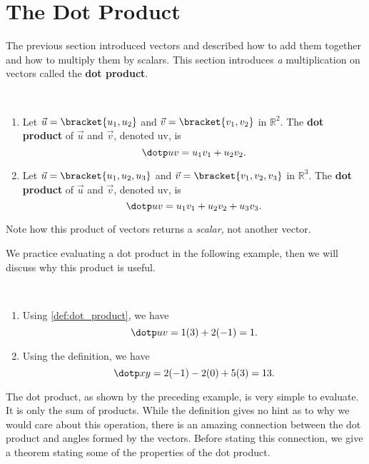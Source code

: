 \section{The Dot Product}\label{sec:dot_product}

The previous section introduced vectors and described how to add them together and how to multiply them by scalars. This section introduces \emph{a} multiplication on vectors called the \textbf{dot product}.

{
\mbox{}\\[-2\baselineskip]\begin{enumerate}
	\item Let $\vec u =\bracket{u_1,u_2}$ and $\vec v = \bracket{v_1,v_2}$  in $\mathbb{R}^2$. The \textbf{dot product} of $\vec u$ and $\vec v$, denoted \dotp uv, is 
	\[\dotp uv = u_1v_1+u_2v_2.\]
	\item Let $\vec u = \bracket{u_1,u_2,u_3}$ and $\vec v = \bracket{v_1,v_2,v_3}$  in $\mathbb{R}^3$. The \textbf{dot product} of $\vec u$ and $\vec v$, denoted \dotp uv, is 
	\[\dotp uv = u_1v_1+u_2v_2+u_3v_3.\]
\end{enumerate}}

Note how this product of vectors returns a \emph{scalar}, not another vector.

We practice evaluating a dot product in the following example, then we will discuss why this product is useful.

{\mbox{}\\[-\baselineskip]\begin{enumerate}
	\item Using \autoref{def:dot_product}, we have
	\[\dotp uv = 1(3)+2(-1) = 1.\]
	\item	Using the definition, we have
	\[\dotp xy = 2(-1)  -2(0) + 5(3) = 13.\]
\end{enumerate}}

The dot product, as shown by the preceding example, is very simple to evaluate. It is only the sum of products. While the definition gives no hint as to why we would care about this operation, there is an amazing connection between the dot product and angles formed by the vectors. Before stating this connection, we give a theorem stating some of the properties of the dot product.

